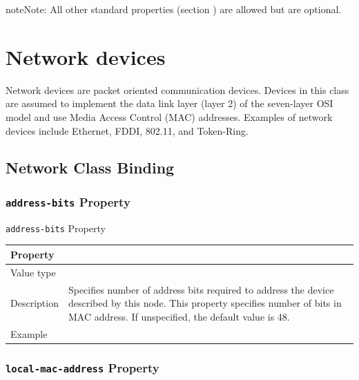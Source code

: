 \documentclass[a4paper,10pt,oneside]{sphinxmanual}
\begin{document}
\begin{notice}{note}{Note:}
All other standard properties (section
{\hyperref[devicetree\string-basics:sect\string-standard\string-properties]{}}) are allowed but are optional.
\end{notice}


\section{Network devices}
\label{device-bindings:network-devices}
Network devices are packet oriented communication devices. Devices in
this class are assumed to implement the data link layer (layer 2) of the
seven-layer OSI model and use Media Access Control (MAC) addresses.
Examples of network devices include Ethernet, FDDI, 802.11, and
Token-Ring.


\subsection{Network Class Binding}
\label{device-bindings:network-class-binding}

\subsubsection{\texttt{address-bits} Property}
\label{device-bindings:address-bits-property}

\begin{threeparttable}
\capstart\caption{\texttt{address-bits} Property}\label{device-bindings:id9}
\begin{tabulary}{\linewidth}{| l J |}
\hline
\textsf{\relax 
Property
} & \textsf{\relax 
{}
}\\
\hline
Value type
 & 
\\
\hline
Description
 & 
Specifies number of address bits required to address the
device described by this node. This property specifies number
of bits in MAC address. If unspecified, the default value is 48.
\\
\hline
Example
 & 
\\
\hline\end{tabulary}

\end{threeparttable}



\subsubsection{\texttt{local-mac-address} Property}
\label{device-bindings:local-mac-address-property}
\end{document}
